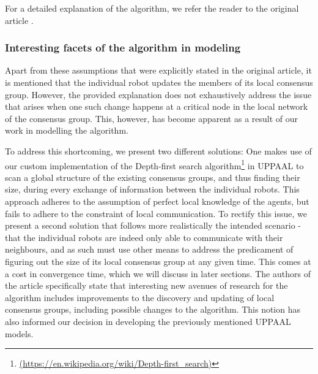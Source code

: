 For a detailed explanation of the algorithm, we refer the reader to the original article \parencite{AlgorithmPaper}.

\subsubsection{Interesting facets of the algorithm in modeling}

Apart from these assumptions that were explicitly stated in the original article, it is mentioned that the individual robot updates the members of its local consensus group. However, the provided explanation does not exhaustively address the issue that arises when one such change happens at a critical node in the local network of the consensus group. This, however, has become apparent as a result of our work in modelling the algorithm. 

To address this shortcoming, we present two different solutions: One makes use of our custom implementation of the Depth-first search algorithm\footnote{\url{(https://en.wikipedia.org/wiki/Depth-first_search)}} in UPPAAL to scan a global structure of the existing consensus groups, and thus finding their size, during every exchange of information between the individual robots. This approach adheres to the assumption of perfect local knowledge of the agents, but fails to adhere to the constraint of local communication. To rectify this issue, we present a second solution that follows more realistically the intended scenario - that the individual robots are indeed only able to communicate with their neighbours, and as such must use other means to address the predicament of figuring out the size of its local consensus group at any given time. This comes at a cost in convergence time, which we will discuss in later sections.
The authors of the article specifically state that interesting new avenues of research for the algorithm includes improvements to the discovery and updating of local consensus groups, including possible changes to the algorithm. This notion has also informed our decision in developing the previously mentioned UPPAAL models.

